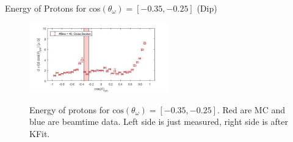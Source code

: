 \documentclass[
		10pt
		]{beamer}
\begin{document}
\begin{frame}{Energy of Protons for cos$(\theta_{\omega})=[-0.35,-0.25]$ (Dip)}
	
	\begin{figure}
		\hspace{0cm}  \vspace{-1cm}
		\includegraphics[width=6cm]{Plots/7}
	\end{figure}
	
	\begin{figure}%
		\centering
		\qquad
		\captionsetup{labelformat=empty}
		\caption{Energy of protons for $\textrm{cos}(\theta_{\omega}) = [-0.35, -0.25] $. Red are MC and blue are beamtime data. Left side is just measured, right side is after KFit. }%
		\label{fig:example}%
	\end{figure}
	
\end{frame}
\end{document}
